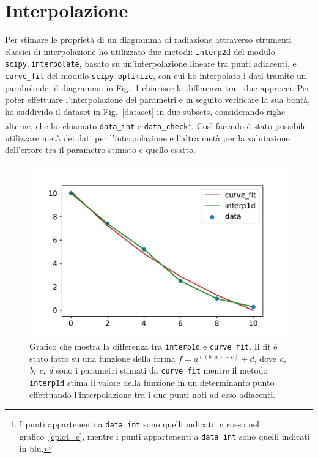 \documentclass[12pt,a4paper,final]{book}
\begin{document}
\section{Interpolazione}\label{interpolazione}
Per stimare le proprietà di un diagramma di radiazione attraverso strumenti classici di interpolazione ho utilizzato due metodi: \texttt{interp2d} del modulo \texttt{scipy.interpolate}, basato su un'interpolazione lineare tra punti adiacenti, e \texttt{curve\_fit} del modulo \texttt{scipy.optimize}, con cui ho interpolato i dati tramite un paraboloide; il diagramma in Fig.~\ref{es_interp} chiarisce la differenza tra i due approcci.
Per poter effettuare l'interpolazione dei parametri e in seguito verificare la sua bontà, ho suddivido il dataset in Fig.~\ref{dataset} in due subsets, considerando righe alterne, che ho chiamato \texttt{data\_int} e \texttt{data\_check}\footnote{I punti appartenenti a \texttt{data\_int} sono quelli indicati in rosso nel grafico~\ref{cplot_e}, mentre i punti appartenenti a \texttt{data\_int} sono quelli indicati in blu.}. Così facendo è stato possibile utilizzare metà dei dati per l'interpolazione e l'altra metà per la valutazione dell'errore tra il parametro stimato e quello esatto.

\begin{figure}[!ht]
	\centering
	\includegraphics[scale=0.8]{../figures/EsempioInterpolazione.pdf}
	\caption{Grafico che mostra la differenza tra \texttt{interp1d} e \texttt{curve\_fit}. Il fit è stato fatto su una funzione della forma $f=a^{((b\cdot x)+c)}+d$, dove \textit{a, b, c, d} sono i parametri stimati da \texttt{curve\_fit} mentre il metodo \texttt{interp1d} stima il valore della funzione in un determinanto punto effettuando l'interpolazione tra i due punti noti ad esso adiacenti.}
	\label{es_interp}
\end{figure}
\end{document}
